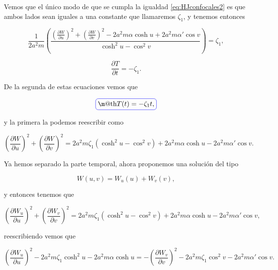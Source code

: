\documentclass[a4paper,10pt]{article}
\makeatletter
\numberwithin{equation}{section}
\newcommand*{\boxcolor}{blue}
\renewcommand{\boxed}[1]{\textcolor{\boxcolor}{%
\tikz[baseline={([yshift=-1ex]current bounding box.center)}] \node [rectangle, minimum width=1ex,rounded corners,draw] {\normalcolor\m@th$\displaystyle#1$};}}
\makeatother
\begin{document}
Vemos que el único modo de que se cumpla la igualdad \eqref{eq:HJconfocales2} es que 
ambos lados sean iguales a una constante que llamaremos $\zeta_1$, y tenemos entonces 

\begin{equation}
 \frac{1}{2a^2m}\left( \frac{\left(\frac{\partial W}{\partial u} \right)^2 + 
\left(\frac{\partial W}{\partial v} \right)^2- 2a^2m\alpha \cosh{u} + 
2a^2m\alpha'\cos{v}}{\cosh^2{u}- \cos^2{v}}\right) = \zeta_1,
\end{equation}

\begin{equation}
 \frac{\partial T}{\partial t} = - \zeta_1.
\end{equation}

De la segunda de estas ecuaciones vemos que 

\begin{equation}
 \boxed{T(t) = - \zeta_1t,}
\end{equation}

y la primera la podemos reescribir como 

\begin{equation}
\left(\frac{\partial W}{\partial u} \right)^2 + 
\left(\frac{\partial W}{\partial v} \right)^2
= 2a^2m\zeta_1(\cosh^2{u}- \cos^2{v})
+ 2a^2m\alpha \cosh{u} - 
2a^2m\alpha'\cos{v}.
\end{equation}

Ya hemos separado la parte temporal, ahora proponemos una solución del tipo 

\begin{equation}
 W(u,v) = W_u(u) + W_v(v),
\end{equation}

y entonces tenemos que 

\begin{equation}
\left(\frac{\partial W_u}{\partial u} \right)^2 + 
\left(\frac{\partial W_v}{\partial v} \right)^2
= 2a^2m\zeta_1(\cosh^2{u}- \cos^2{v})
+ 2a^2m\alpha \cosh{u} - 
2a^2m\alpha'\cos{v},
\end{equation}

reescribiendo vemos que 

\begin{equation}
 \left(\frac{\partial W_u}{\partial u} \right)^2 - 2a^2m\zeta_1\cosh^2{u} - 
 2a^2m\alpha\cosh{u} = 
 - \left(\frac{\partial W_v}{\partial v} \right)^2 - 2a^2m\zeta_1\cos^2{v} - 
 2a^2m\alpha'\cos{v}.
 \label{eq:HJconfocales3}
\end{equation}
\end{document}
